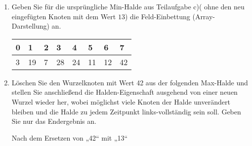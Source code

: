 \documentclass{bschlangaul-aufgabe}
\begin{document}
\begin{enumerate}
\begin{bAntwort}
\begin{bBaum}{Nach dem Vertauschen von „13“ und „28“}
\end{bBaum}

\begin{bBaum}{Nach dem Vertauschen von „13“ und „19“}

\end{bBaum}
\end{bAntwort}


\item Geben Sie für die ursprüngliche Min-Halde aus Teilaufgabe c)(\dh
ohne den neu eingefügten Knoten mit dem Wert $13$) die Feld-Einbettung
(Array-Darstellung) an.

\begin{bAntwort}
\begin{tabular}{llllllll}
\bf{0} & \bf{1} & \bf{2} & \bf{3} & \bf{4} & \bf{5} & \bf{6} & \bf{7} \\
\hline
3      & 19     & 7      & 28     & 24     & 11     & 12     & 42     \\
\end{tabular}
\end{bAntwort}


\item Löschen Sie den Wurzelknoten mit Wert 42 aus der folgenden
Max-Halde und stellen Sie anschließend die Halden-Eigenschaft ausgehend
von einer neuen Wurzel wieder her, wobei möglichst viele Knoten der
Halde unverändert bleiben und die Halde zu jedem Zeitpunkt
links-vollständig sein soll. Geben Sie nur das Endergebnis an.

\begin{center}
\end{center}

\begin{bAntwort}
\begin{bBaum}{Nach dem Ersetzen von „42“ mit „13“}
\end{bBaum}


\end{bAntwort}
\end{enumerate}
\end{document}
